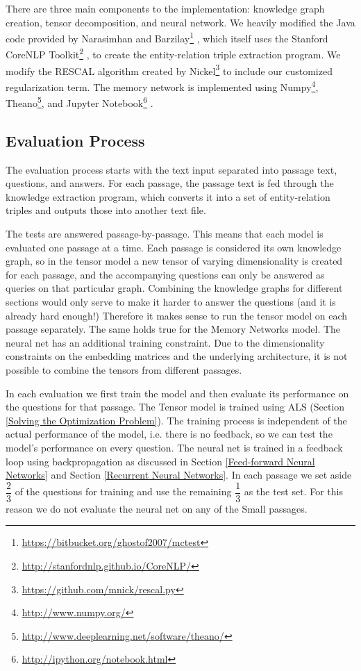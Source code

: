 \documentclass[pageno]{final_paper}
\begin{document}
There are three main components to the implementation: knowledge graph creation,
tensor decomposition, and neural network. We heavily modified the Java code
provided by Narasimhan and
Barzilay\footnote{\url{https://bitbucket.org/ghostof2007/mctest}}
\cite{Narasimhan2015}, which itself uses the Stanford CoreNLP
Toolkit\footnote{\url{http://stanfordnlp.github.io/CoreNLP/}}
\cite{Manning2014}, to create the entity-relation triple extraction program. We
modify the  RESCAL algorithm created by
Nickel\footnote{\url{https://github.com/mnick/rescal.py}} \cite{Nickel2011} to
include our customized regularization term. The memory network is implemented
using Numpy\footnote{\url{http://www.numpy.org/}},
Theano\footnote{\url{http://www.deeplearning.net/software/theano/}}, and Jupyter
Notebook\footnote{\url{http://ipython.org/notebook.html}} \cite{Jones2001,
Perez2007, Bastien2012, Bergstra2010}.

\subsection{Evaluation Process}
\label{Evaluation Process}

The evaluation process starts with the text input separated into passage text,
questions, and answers. For each passage, the passage text is fed through the
knowledge extraction program, which converts it into a set of entity-relation
triples and outputs those into another text file.

The tests are answered passage-by-passage. This means that each model is
evaluated one passage at a time. Each passage is considered its own knowledge
graph, so in the tensor model a new tensor of varying dimensionality is created
for each passage, and the accompanying questions can only be answered as queries
on that particular graph. Combining the knowledge graphs for different sections
would only serve to make it harder to answer the questions (and it is already
hard enough!) Therefore it makes sense to run the tensor model on each passage
separately. The same holds true for the Memory Networks model. The neural net
has an additional training constraint. Due to the dimensionality constraints on
the embedding matrices and the underlying architecture, it is not possible to
combine the tensors from different passages.

In each evaluation we first train the model and then evaluate its performance on
the questions for that passage. The Tensor model is trained using ALS (Section
\ref{Solving the Optimization Problem}). The training process is independent of
the actual performance of the model, i.e. there is no feedback, so we can test
the model's performance on every question. The neural net is trained in a
feedback loop using backpropagation as discussed in Section \ref{Feed-forward
Neural Networks} and Section \ref{Recurrent Neural Networks}. In each passage we
set aside $\dfrac{2}{3}$ of the questions for training and use the remaining
$\dfrac{1}{3}$ as the test set. For this reason we do not evaluate the neural
net on any of the Small passages.
\end{document}
